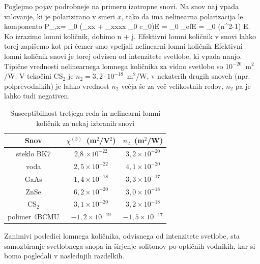 Poglejmo pojav podrobneje na primeru izotropne snovi. Na snov naj vpada valovanje, ki je polarizirano
v smeri $x$, tako da ima nelinearna polarizacija le komponento 
\beq
P_{,x}=
\epsilon_{0} \left(\chi_{xx} + \chi_{xxxx}
{\varepsilon_0  c_0}\right)E = \varepsilon_0 \chi_{ef}E = \varepsilon_0 (n^2-1) E.
\eeq
Ko izrazimo lomni količnik, dobimo
\beq
n \approx {} +  j.
\eeq
Efektivni lomni količnik v snovi lahko torej zapišemo kot 
pri čemer smo vpeljali nelinearni lomni količnik
Efektivni lomni količnik snovi je torej odvisen od intenzitete svetlobe, ki vpada nanjo. 
Tipične vrednosti nelinearnega lomnega količnika za vidno svetlobo so $10^{-20}$~m$^2$/W.
V tekočini CS$_2$ je $n_2 = 3,2 \cdot 10^{-18}$~m$^2$/W, v nekaterih 
drugih snoveh (npr. polprevodnikih) je lahko vrednost $n_2$ večja še za več 
velikostnih redov, $n_2$ pa je lahko tudi negativen. 

\begin{table}[h]
 \centering
\begin{tabular}{|c|c|c|} \hline  
      Snov & $\chi^{(3)}$~(m$^2$/V$^2$) & $n_2$~(m$^2$/W)\\ \hline
     steklo BK7 & 2,8 $\times 10^{-22}$ & $3,2 \times 10^{-20}$ \\ \hline
     voda & $2,5 \times 10^{-22}$ & $4,1 \times 10^{-20}$ \\ \hline
     GaAs & $1,4 \times 10^{-18}$ & $3,3 \times 10^{-17}$ \\ \hline
     ZnSe & $6,2 \times 10^{-20}$ & $3,0 \times 10^{-18}$ \\ \hline
     CS$_2$ & $3,1 \times 10^{-20}$ & $3,2 \times 10^{-18}$ \\ \hline 
     polimer 4BCMU  & $-1,2 \times 10^{-19}$ & $-1,5 \times 10^{-17}$ \\ \hline      
\end{tabular}
  \caption{Susceptibilnost tretjega reda in nelinearni lomni količnik za nekaj izbranih snovi}
\label{table:chi3}
\end{table}

Zanimivi posledici lomnega količnika, odvisnega od intenzitete svetlobe, 
sta samozbiranje svetlobnega snopa in širjenje solitonov po optičnih vodnikih, 
kar si bomo pogledali v naslednjih
razdelkih.

